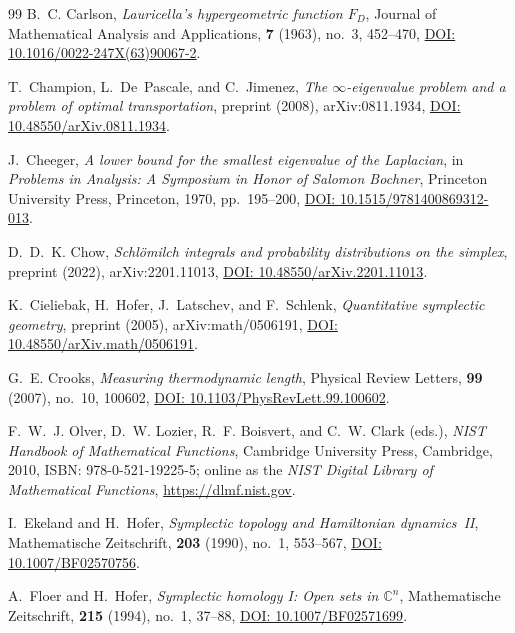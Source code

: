 \documentclass[11pt,a4paper,reqno]{amsart}
\theoremstyle{definition}
\theoremstyle{remark}
\numberwithin{equation}{section}
\begin{document}
\begin{thebibliography}{99}
B.~C. Carlson,
\emph{Lauricella's hypergeometric function $F_D$},
Journal of Mathematical Analysis and Applications, \textbf{7} (1963), no.~3, 452--470,
\href{https://doi.org/10.1016/0022-247X(63)90067-2}{DOI: 10.1016/0022-247X(63)90067-2}.

T.~Champion, L.~De~Pascale, and C.~Jimenez,
\emph{The $\infty$-eigenvalue problem and a problem of optimal transportation},
preprint (2008), arXiv:0811.1934,
\href{https://doi.org/10.48550/arXiv.0811.1934}{DOI: 10.48550/arXiv.0811.1934}.

J.~Cheeger,
\emph{A lower bound for the smallest eigenvalue of the Laplacian},
in \emph{Problems in Analysis: A Symposium in Honor of Salomon Bochner}, Princeton University Press, Princeton, 1970, pp.~195--200,
\href{https://doi.org/10.1515/9781400869312-013}{DOI: 10.1515/9781400869312-013}.

D.~D.~K. Chow,
\emph{Schl\"omilch integrals and probability distributions on the simplex},
preprint (2022), arXiv:2201.11013,
\href{https://doi.org/10.48550/arXiv.2201.11013}{DOI: 10.48550/arXiv.2201.11013}.

K.~Cieliebak, H.~Hofer, J.~Latschev, and F.~Schlenk,
\emph{Quantitative symplectic geometry},
preprint (2005), arXiv:math/0506191,
\href{https://doi.org/10.48550/arXiv.math/0506191}{DOI: 10.48550/arXiv.math/0506191}.

G.~E. Crooks,
\emph{Measuring thermodynamic length},
Physical Review Letters, \textbf{99} (2007), no.~10, 100602,
\href{https://doi.org/10.1103/PhysRevLett.99.100602}{DOI: 10.1103/PhysRevLett.99.100602}.

F.~W.~J. Olver, D.~W. Lozier, R.~F. Boisvert, and C.~W. Clark (eds.),
\emph{NIST Handbook of Mathematical Functions},
Cambridge University Press, Cambridge, 2010, ISBN: 978-0-521-19225-5;
online as the \emph{NIST Digital Library of Mathematical Functions}, \url{https://dlmf.nist.gov}.

I.~Ekeland and H.~Hofer,
\emph{Symplectic topology and Hamiltonian dynamics~II},
Mathematische Zeitschrift, \textbf{203} (1990), no.~1, 553--567,
\href{https://doi.org/10.1007/BF02570756}{DOI: 10.1007/BF02570756}.

A.~Floer and H.~Hofer,
\emph{Symplectic homology I: Open sets in $\mathbb{C}^n$},
Mathematische Zeitschrift, \textbf{215} (1994), no.~1, 37--88,
\href{https://doi.org/10.1007/BF02571699}{DOI: 10.1007/BF02571699}.


\end{thebibliography}
\end{document}
